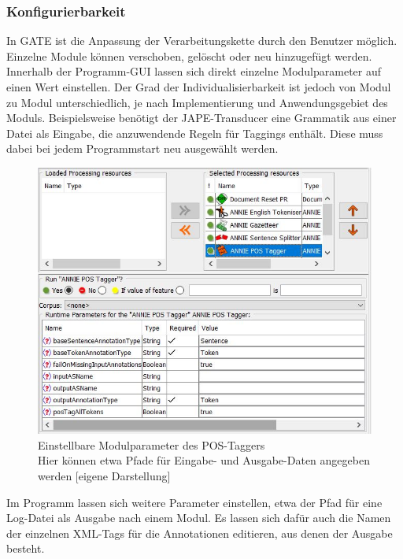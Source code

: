 \documentclass[12pt]{report}
\begin{document}
\subsubsection{Konfigurierbarkeit}
In GATE ist die Anpassung der Verarbeitungskette durch den Benutzer möglich. Einzelne Module können verschoben, gelöscht oder neu hinzugefügt werden. Innerhalb der Programm-GUI lassen sich direkt einzelne Modulparameter auf einen Wert einstellen. Der Grad der Individualisierbarkeit ist jedoch von Modul zu Modul unterschiedlich, je nach Implementierung und Anwendungsgebiet des Moduls. Beispielsweise benötigt der JAPE-Transducer eine Grammatik aus einer Datei als Eingabe, die anzuwendende Regeln für Taggings enthält. Diese muss dabei bei jedem Programmstart neu ausgewählt werden.

\begin{figure}[h!]
\begin{center}
\includegraphics[scale=0.8]{GATE_Bilder/POSTagger.jpg}
\caption{Einstellbare Modulparameter des POS-Taggers \\ Hier können etwa Pfade für Eingabe- und Ausgabe-Daten angegeben werden [eigene Darstellung]}
\end{center}
\end{figure} 

Im Programm lassen sich weitere Parameter einstellen, etwa der Pfad für eine Log-Datei als Ausgabe nach einem Modul. Es lassen sich dafür auch die Namen der einzelnen XML-Tags für die Annotationen editieren, aus denen der Ausgabe besteht.
\end{document}

